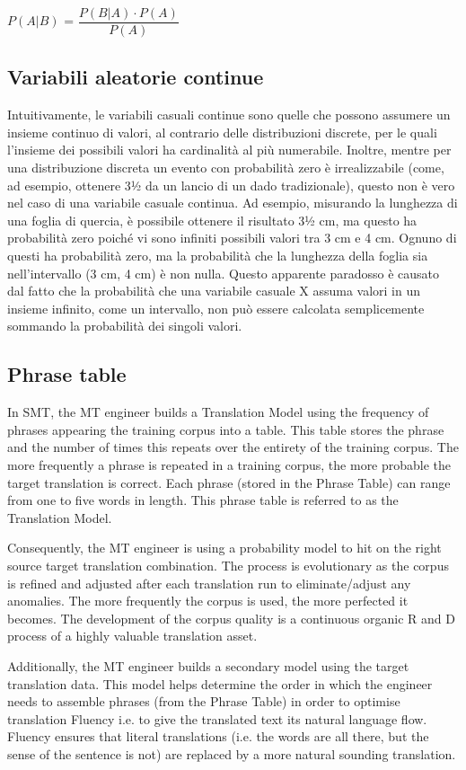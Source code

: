 $P(A | B)$ = $\dfrac{ P(B | A) \cdot P(A)}{P(A)}$

\subsection{Variabili aleatorie continue}

Intuitivamente, le variabili casuali continue sono quelle che possono assumere un insieme continuo di valori, al contrario delle distribuzioni discrete, per le quali l'insieme dei possibili valori ha cardinalità al più numerabile. Inoltre, mentre per una distribuzione discreta un evento con probabilità zero è irrealizzabile (come, ad esempio, ottenere 3½ da un lancio di un dado tradizionale), questo non è vero nel caso di una variabile casuale continua. Ad esempio, misurando la lunghezza di una foglia di quercia, è possibile ottenere il risultato 3½ cm, ma questo ha probabilità zero poiché vi sono infiniti possibili valori tra 3 cm e 4 cm. Ognuno di questi ha probabilità zero, ma la probabilità che la lunghezza della foglia sia nell'intervallo (3 cm, 4 cm) è non nulla. Questo apparente paradosso è causato dal fatto che la probabilità che una variabile casuale X assuma valori in un insieme infinito, come un intervallo, non può essere calcolata semplicemente sommando la probabilità dei singoli valori.

\subsection{Phrase table}
In SMT, the MT engineer builds a Translation Model using the frequency of phrases appearing the training corpus into a table. This table stores the phrase and the number of times this repeats over the entirety of the training corpus. The more frequently a phrase is repeated in a training corpus, the more probable the target translation is correct. Each phrase (stored in the Phrase Table) can range from one to five words in length. This phrase table is referred to as the Translation Model.

Consequently, the MT engineer is using a probability model to hit on the right source target translation combination. The process is evolutionary as the corpus is refined and adjusted after each translation run to eliminate/adjust any anomalies. The more frequently the corpus is used, the more perfected it becomes. The development of the corpus quality is a continuous organic R and D process of a highly valuable translation asset.

Additionally, the MT engineer builds a secondary model using the target translation data. This model helps determine the order in which the engineer needs to assemble phrases (from the Phrase Table) in order to optimise translation Fluency i.e. to give the translated text its natural language flow. Fluency ensures that literal translations (i.e. the words are all there, but the sense of the sentence is not) are replaced by a more natural sounding translation.


